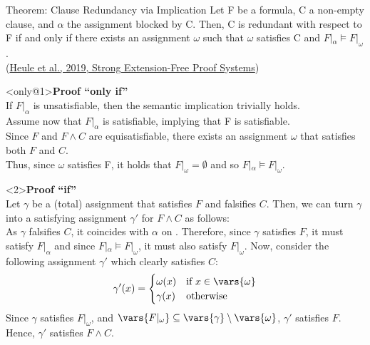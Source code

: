 \documentclass[t]{sdqbeamer}
\begin{document}
\begin{frame}{Theorem: Clause Redundancy via Implication}
\vspace*{-2ex}
Let F be a formula, C a non-empty clause, and $\alpha$ the assignment blocked by C. Then, C is redundant with respect to F if and only if there exists an assignment $\omega$ such that $\omega$ satisfies C and $F|_\alpha \models F|_\omega$.\\
\hfill(\href{https://doi.org/10.1007/s10817-019-09516-0}{Heule et al., 2019, Strong Extension-Free Proof Systems})

\begin{block}<only@1>{\textbf{Proof ``only if''}}
 \\[1ex]
If $F|_\alpha$ is unsatisfiable, then the semantic implication trivially holds.\\[1ex]
Assume now that $F|_\alpha$ is satisfiable, implying that F is satisfiable.\\
Since $F$ and $F \land C$ are equisatisfiable, there exists an assignment $\omega$ that satisfies both $F$ and $C$.\\
Thus, since $\omega$ satisfies F, it holds that $F|_\omega = \emptyset$ and so $F|_\alpha \models F|_\omega$.
\end{block}

\begin{block}<2>{\textbf{Proof ``if''}}
 \\[1ex]
Let $\gamma$ be a (total) assignment that satisfies $F$ and falsifies $C$. Then, we can turn $\gamma$ into a satisfying assignment $\gamma'$ for $F \land C$ as follows:\\
As $\gamma$ falsifies $C$, it coincides with $\alpha$ on . Therefore, since $\gamma$ satisfies $F$, it must satisfy $F|_\alpha$ and since $F|_\alpha \models F|_\omega$, it must also satisfy $F|_\omega$.
Now, consider the following assignment $\gamma'$ which clearly satisfies $C$:
$$
\gamma'(x) = \begin{cases} 
    \omega(x) & \text{if } x \in \vars{\omega}\\ 
    \gamma(x) & \text{otherwise}
\end{cases}
$$
Since $\gamma$ satisfies $F|_\omega$, and $\vars{F|_\omega} \subseteq \vars{\gamma} \setminus \vars{\omega}$, $\gamma'$ satisfies $F$.
Hence, $\gamma'$ satisfies $F \land C$.
\end{block}
\end{frame}
\end{document}
